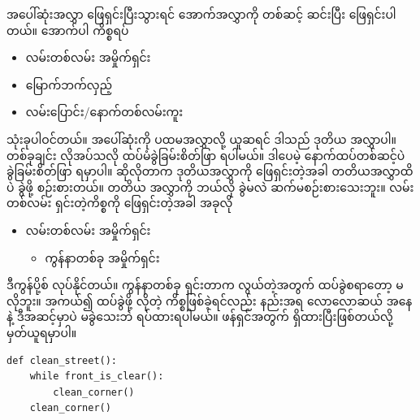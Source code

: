 အပေါ်ဆုံးအလွှာ ဖြေရှင်းပြီးသွားရင် အောက်အလွှာကို တစ်ဆင့် ဆင်းပြီး ဖြေရှင်းပါတယ်။ အောက်ပါ ကိစ္စရပ် 
%
\begin{itemize}
    \item လမ်းတစ်လမ်း အမှိုက်ရှင်း       
    \item မြောက်ဘက်လှည့် 
    \item လမ်းပြောင်း/နောက်တစ်လမ်းကူး 
\end{itemize}
%
သုံးခုပါဝင်တယ်။ အပေါ်ဆုံးကို ပထမအလွှာလို့ ယူဆရင် ဒါသည် ဒုတိယ အလွှာပါ။ တစ်ခုချင်း လိုအပ်သလို ထပ်မံခွဲခြမ်းစိတ်ဖြာ ရပါမယ်။ ဒါပေမဲ့ နောက်ထပ်တစ်ဆင့်ပဲ ခွဲခြမ်းစိတ်ဖြာ ရမှာပါ။ ဆိုလိုတာက ဒုတိယအလွှာကို ဖြေရှင်းတဲ့အခါ တတိယအလွှာထိပဲ ခွဲဖို့ စဉ်းစားတယ်။ တတိယ အလွှာကို ဘယ်လို ခွဲမလဲ ဆက်မစဉ်းစားသေးဘူး။ လမ်းတစ်လမ်း ရှင်းတဲ့ကိစ္စကို ဖြေရှင်းတဲ့အခါ အခုလို
%
\begin{itemize}
    \item လမ်းတစ်လမ်း အမှိုက်ရှင်း       
    \begin{itemize}
        \item ကွန်နာတစ်ခု အမှိုက်ရှင်း  
    \end{itemize}
\end{itemize}
%
ဒီကွန်ပို့စ်  လုပ်နိုင်တယ်။ ကွန်နာတစ်ခု ရှင်းတာက လွယ်တဲ့အတွက် ထပ်ခွဲစရာတော့ မလိုဘူး။ အကယ်၍ ထပ်ခွဲဖို့ လိုတဲ့ ကိစ္စဖြစ်ခဲ့ရင်လည်း  နည်းအရ လောလောဆယ် အနေနဲ့ ဒီအဆင့်မှာပဲ မခွဲသေးဘဲ ရပ်ထားရပါမယ်။  ဖန်ရှင်အတွက်  ရှိထားပြီးဖြစ်တယ်လို့ မှတ်ယူရမှာပါ။
%
\setlength{\fboxsep}{0pt}
\begin{verbatim}
def clean_street():
    while front_is_clear():
        clean_corner()
    clean_corner()
\end{verbatim}
%

